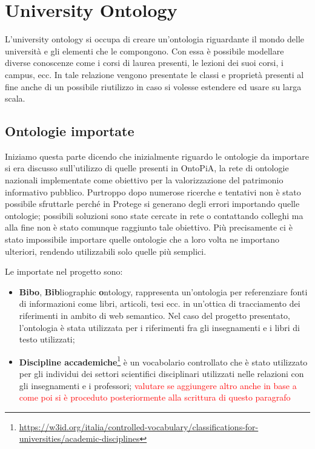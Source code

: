\chapter{University Ontology}

L'university ontology si occupa di creare un'ontologia riguardante il mondo delle università e gli elementi che le compongono. Con essa è possibile modellare diverse conoscenze come i corsi di laurea presenti, le lezioni dei suoi corsi, i campus, ecc.
In tale relazione vengono presentate le classi e proprietà presenti al fine anche di un possibile riutilizzo in caso si volesse estendere ed usare su larga scala.

\section{Ontologie importate}

Iniziamo questa parte dicendo che inizialmente riguardo le ontologie da importare si era discusso sull'utilizzo di quelle presenti in OntoPiA, la rete di ontologie nazionali implementate come obiettivo per la valorizzazione del patrimonio informativo pubblico. Purtroppo dopo numerose ricerche e tentativi non è stato possibile sfruttarle perché in Protege si generano degli errori importando quelle ontologie; possibili soluzioni sono state cercate in rete o contattando colleghi ma alla fine non è stato comunque raggiunto tale obiettivo. Più precisamente ci è stato impossibile importare quelle ontologie che a loro volta ne importano ulteriori, rendendo utilizzabili solo quelle più semplici.

Le importate nel progetto sono:

\begin{itemize}
    \item \textbf{Bibo}, \textbf{Bib}liographic \textbf{o}ntology, rappresenta un'ontologia per referenziare fonti di informazioni come libri, articoli, tesi ecc. in un'ottica di tracciamento dei riferimenti in ambito di web semantico. Nel caso del progetto presentato, l'ontologia è stata utilizzata per i riferimenti fra gli insegnamenti e i libri di testo utilizzati;

    \item \textbf{Discipline accademiche}\footnote{\url{https://w3id.org/italia/controlled-vocabulary/classifications-for-universities/academic-disciplines}} è un vocabolario controllato che è stato utilizzato per gli individui dei settori scientifici disciplinari utilizzati nelle relazioni con gli insegnamenti e i professori;
    \textcolor{red}{ valutare se aggiungere altro anche in base a come poi si è proceduto posteriormente alla scrittura di questo paragrafo}
\end{itemize}

